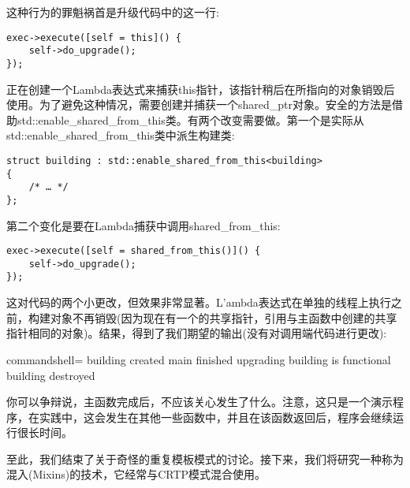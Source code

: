 这种行为的罪魁祸首是升级代码中的这一行:

\begin{lstlisting}[style=styleCXX]
exec->execute([self = this]() {
	self->do_upgrade();
});
\end{lstlisting}

正在创建一个Lambda表达式来捕获this指针，该指针稍后在所指向的对象销毁后使用。为了避免这种情况，需要创建并捕获一个shared\_ptr对象。安全的方法是借助std::enable\_shared\_from\_this类。有两个改变需要做。第一个是实际从std::enable\_shared\_from\_this类中派生构建类:

\begin{lstlisting}[style=styleCXX]
struct building : std::enable_shared_from_this<building>
{
	/* … */
};
\end{lstlisting}

第二个变化是要在Lambda捕获中调用shared\_from\_this:

\begin{lstlisting}[style=styleCXX]
exec->execute([self = shared_from_this()]() {
	self->do_upgrade();
});
\end{lstlisting}

这对代码的两个小更改，但效果非常显著。L'ambda表达式在单独的线程上执行之前，构建对象不再销毁(因为现在有一个的共享指针，引用与主函数中创建的共享指针相同的对象)。结果，得到了我们期望的输出(没有对调用端代码进行更改):

\begin{tcblisting}{commandshell={}}
building created
main finished
upgrading
building is functional
building destroyed
\end{tcblisting}

你可以争辩说，主函数完成后，不应该关心发生了什么。注意，这只是一个演示程序，在实践中，这会发生在其他一些函数中，并且在该函数返回后，程序会继续运行很长时间。

至此，我们结束了关于奇怪的重复模板模式的讨论。接下来，我们将研究一种称为混入(Mixins)的技术，它经常与CRTP模式混合使用。






















